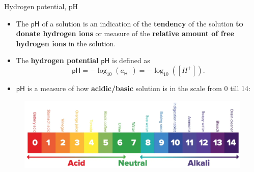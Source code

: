 \begin{frame}{Hydrogen potential, pH}

\begin{itemize}
	\item The \alert{\textbf{$\mathsf{pH}$}} of a solution is an indication of the \textbf{tendency} of the solution \textbf{to donate hydrogen ions}
	or measure of the \textbf{relative amount of free hydrogen ions} in the solution. 
		\pause
	
\item The \alert{\textbf{hydrogen potential}} $\mathsf{pH}$ is defined as
%
\[
\boxed{ 
\mathsf{pH} = - \log_{10} (a_{\mathsf{H^+}}) = - \log_{10} ([H^+]). 
}
\]
%
\vskip -10pt
	\pause
\item $\mathsf{pH}$ is a measure of how \textbf{acidic/basic} solution is in the scale from 0 till 14: 
%
%
\end{itemize}
\begin{figure}
\centering
\includegraphics[width=0.9\columnwidth]{figures/chemical-equilibrium/ph-scale.png}
\end{figure}
\end{frame}
%
%

